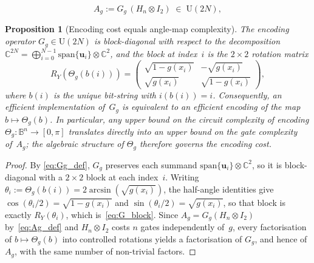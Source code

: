\documentclass[10pt,a4paper]{amsart}
\newtheorem{proposition}{Proposition}
\newcommand{\Thetag}{\Theta_g}
\begin{document}
\begin{equation}
  A_g := G_g\,(H_n\otimes I_2) \;\in\; \mathrm{U}(2N),
  \label{eq:Ag_def}
\end{equation}

\begin{proposition}[Encoding cost equals angle-map complexity]
\label{prop:encoding_cost}
The encoding operator $G_g \in \mathrm{U}(2N)$ is block-diagonal with
respect to the decomposition $\mathbb{C}^{2N} = \bigoplus_{i=0}^{N-1}
\mathrm{span}\{\mathbf{u}_i\} \otimes \mathbb{C}^2$,
and the block at index~$i$ is the $2\times 2$ rotation matrix
\begin{equation}
  R_Y(\Thetag(b(i)))
  = \begin{pmatrix}
      \sqrt{1-g(x_i)} & -\sqrt{g(x_i)} \\
      \sqrt{g(x_i)}   & \sqrt{1-g(x_i)}
    \end{pmatrix},
  \label{eq:G_block}
\end{equation}
where $b(i)$ is the unique bit-string with $i(b(i))=i$.
Consequently, an efficient implementation of~$G_g$ is equivalent to
an efficient encoding of the map $b\mapsto\Thetag(b)$.
In particular, any upper bound on the circuit complexity of encoding
$\Thetag:\mathbb{B}^n\to[0,\pi]$ translates directly into an upper
bound on the gate complexity of~$A_g$; the algebraic structure of
$\Thetag$ therefore governs the encoding cost.
\end{proposition}

\begin{proof}
By \eqref{eq:Gg_def}, $G_g$ preserves each summand
$\mathrm{span}\{\mathbf{u}_i\}\otimes\mathbb{C}^2$, so it is
block-diagonal with a $2\times 2$ block at each index~$i$.
Writing $\theta_i := \Thetag(b(i)) = 2\arcsin(\sqrt{g(x_i)})$, the
half-angle identities give
$\cos(\theta_i/2) = \sqrt{1-g(x_i)}$ and
$\sin(\theta_i/2) = \sqrt{g(x_i)}$, so that block is exactly
$R_Y(\theta_i)$, which is~\eqref{eq:G_block}.
Since $A_g = G_g(H_n\otimes I_2)$ by~\eqref{eq:Ag_def} and
$H_n\otimes I_2$ costs $n$ gates independently of~$g$, every
factorisation of $b\mapsto\Thetag(b)$ into controlled rotations yields
a factorisation of $G_g$, and hence of $A_g$, with the same number of
non-trivial factors.
\end{proof}
\end{document}
